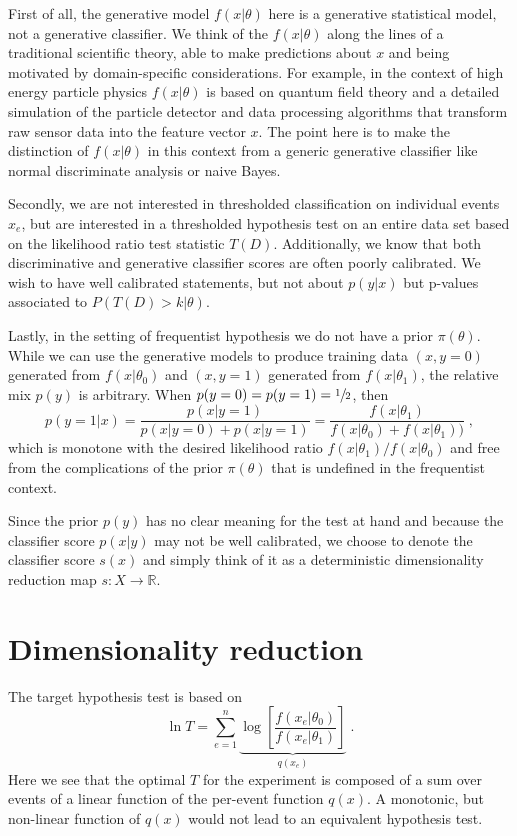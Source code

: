 \documentclass[11pt, oneside]{article}   	%
\begin{document}
First of all, the generative model $f(x|\theta)$ here is a generative statistical model, not a generative classifier. We think of the  $f(x|\theta)$ along the lines of a traditional scientific theory, able to make predictions about $x$ and being motivated by domain-specific considerations. For example, in the context of high energy particle physics $f(x|\theta)$ is based on quantum field theory and a detailed simulation of the particle detector and data processing algorithms that transform raw sensor data into the feature vector $x$. The point here is to make the distinction of $f(x|\theta)$ in this context from a generic generative classifier like normal discriminate analysis or naive Bayes. 

Secondly, we are not interested in thresholded classification on individual events $x_e$, but are interested in a thresholded hypothesis test on an entire data set based on the likelihood ratio test statistic $T(D)$.  
Additionally, we know that both discriminative and generative classifier scores are often poorly calibrated. 
We wish to have well calibrated statements, but not about $p(y|x)$ but p-values associated to $P(T(D) > k |\theta)$.

Lastly, in the setting of frequentist hypothesis we do not have a prior $\pi(\theta)$. 
While we can use the generative models to produce training data $(x,y=0)$ generated 
from $f(x|\theta_0)$ and $(x,y=1)$ generated from $f(x|\theta_1)$, the relative mix $p(y)$ 
is arbitrary.  When $p(y=0)=p(y=1)=\sfrac{1}{2}$, then 
\begin{equation}
p(y=1 | x) = \frac{p(x|y=1)}{p(x|y=0)+p(x|y=1)} = \frac{f(x|\theta_1)}{f(x|\theta_0)+f(x|\theta_1))} \;,
\end{equation}
which is monotone with the desired likelihood ratio $f(x|\theta_1)/f(x|\theta_0)$ and free from the
complications of the prior $\pi(\theta)$ that is undefined in the frequentist context.

Since the prior $p(y)$ has no clear meaning for the test at hand and because the classifier score $p(x|y)$ may not be well calibrated, we choose to denote the classifier score $s(x)$ and simply think of it as a deterministic dimensionality reduction map $s: X \to \mathbb{R}$. 



\section{Dimensionality reduction}


 The target hypothesis test is based on 
\begin{equation}
\ln T =   \sum_{e=1}^n \underbrace{\log \left[ \frac {f(x_e | \theta_0) }{ f(x_e | \theta_1) } \right]}_{q(x_e)} \;.
\end{equation}
Here we see that the optimal $T$ for the experiment is composed of a sum over events of a  linear function of the per-event function $q(x)$. A monotonic, but non-linear function of $q(x)$ would not lead to an equivalent hypothesis test. 
\end{document}
